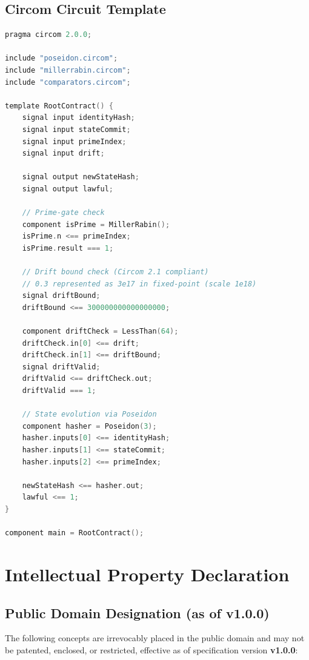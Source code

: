 \documentclass[11pt,a4paper]{article}
\begin{document}
\subsection{Circom Circuit Template}

\begin{lstlisting}[language=C,caption={RootContract Circuit (Circom 2.1+)}]
pragma circom 2.0.0;

include "poseidon.circom";
include "millerrabin.circom";
include "comparators.circom";

template RootContract() {
    signal input identityHash;
    signal input stateCommit;
    signal input primeIndex;
    signal input drift;

    signal output newStateHash;
    signal output lawful;

    // Prime-gate check
    component isPrime = MillerRabin();
    isPrime.n <== primeIndex;
    isPrime.result === 1;

    // Drift bound check (Circom 2.1 compliant)
    // 0.3 represented as 3e17 in fixed-point (scale 1e18)
    signal driftBound;
    driftBound <== 300000000000000000;

    component driftCheck = LessThan(64);
    driftCheck.in[0] <== drift;
    driftCheck.in[1] <== driftBound;
    signal driftValid;
    driftValid <== driftCheck.out;
    driftValid === 1;

    // State evolution via Poseidon
    component hasher = Poseidon(3);
    hasher.inputs[0] <== identityHash;
    hasher.inputs[1] <== stateCommit;
    hasher.inputs[2] <== primeIndex;

    newStateHash <== hasher.out;
    lawful <== 1;
}

component main = RootContract();
\end{lstlisting}

\section{Intellectual Property Declaration}

\subsection{Public Domain Designation (as of v1.0.0)}

The following concepts are irrevocably placed in the public domain and may not be patented, enclosed, or restricted, effective as of specification version \textbf{v1.0.0}:
\end{document}
